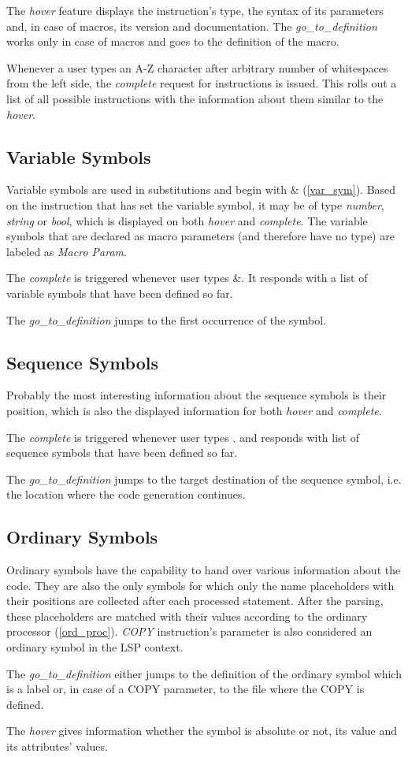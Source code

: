 The \emph{hover} feature displays the instruction's type, the syntax of its parameters and, in case of macros, its version and documentation. The \emph{go\_to\_definition} works only in case of macros and goes to the definition of the macro.

Whenever a user types an A-Z character after arbitrary number of whitespaces from the left side, the \emph{complete} request for instructions is issued. This rolls out a list of all possible instructions with the information about them similar to the \emph{hover}.

\subsection{Variable Symbols}

Variable symbols are used in substitutions and begin with \& (\cref{var_sym}). Based on the instruction that has set the variable symbol, it may be of type \emph{number}, \emph{string} or \emph{bool}, which is displayed on both \emph{hover} and \emph{complete}. The variable symbols that are declared as macro parameters (and therefore have no type) are labeled as \emph{Macro Param}.

The \emph{complete} is triggered whenever user types \&. It responds with a list of variable symbols that have been defined so far.

The \emph{go\_to\_definition} jumps to the first occurrence of the symbol.

\subsection{Sequence Symbols}

Probably the most interesting information about the sequence symbols is their position, which is also the displayed information for both \emph{hover} and \emph{complete}.

The \emph{complete} is triggered whenever user types . and responds with list of sequence symbols that have been defined so far.

The \emph{go\_to\_definition} jumps to the target destination of the sequence symbol, i.e. the location where the code generation continues.

\subsection{Ordinary Symbols}

Ordinary symbols have the capability to hand over various information about the code. They are also the only symbols for which only the name placeholders with their positions are collected after each processed statement. After the parsing, these placeholders are matched with their values according to the ordinary processor (\cref{ord_proc}). \emph{COPY} instruction's parameter is also considered an ordinary symbol in the LSP context.  

The \emph{go\_to\_definition} either jumps to the definition of the ordinary symbol which is a label or, in case of a COPY parameter, to the file where the COPY is defined.

The \emph{hover} gives information whether the symbol is absolute or not, its value and its attributes' values. 




